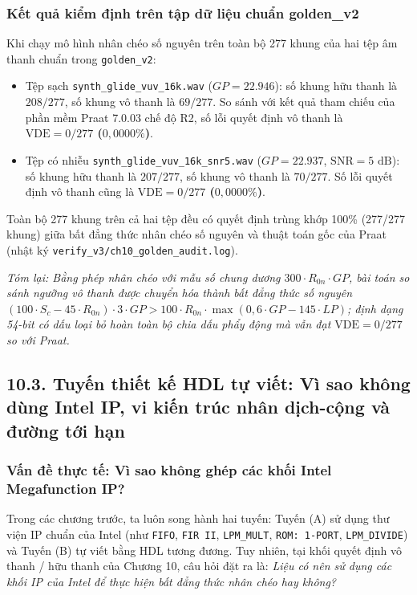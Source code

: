 \subsubsection*{Kết quả kiểm định trên tập dữ liệu chuẩn golden\_v2}
Khi chạy mô hình nhân chéo số nguyên trên toàn bộ 277 khung của hai tệp âm thanh chuẩn trong \texttt{golden\_v2}:
\begin{itemize}
    \item Tệp sạch \texttt{synth\_glide\_vuv\_16k.wav} ($GP = 22.946$): số khung hữu thanh là $208 / 277$, số khung vô thanh là $69 / 277$. So sánh với kết quả tham chiếu của phần mềm Praat 7.0.03 chế độ R2, số lỗi quyết định vô thanh là \textbf{$\text{VDE} = 0 / 277$ ($0{,}0000\%$)}.
    \item Tệp có nhiễu \texttt{synth\_glide\_vuv\_16k\_snr5.wav} ($GP = 22.937$, $\text{SNR} = 5\text{ dB}$): số khung hữu thanh là $207 / 277$, số khung vô thanh là $70 / 277$. Số lỗi quyết định vô thanh cũng là \textbf{$\text{VDE} = 0 / 277$ ($0{,}0000\%$)}.
\end{itemize}
Toàn bộ 277 khung trên cả hai tệp đều có quyết định trùng khớp 100\% (277/277 khung) giữa bất đẳng thức nhân chéo số nguyên và thuật toán gốc của Praat (nhật ký \texttt{verify\_v3/ch10\_golden\_audit.log}).

\textit{Tóm lại: Bằng phép nhân chéo với mẫu số chung dương $300 \cdot R_{0n} \cdot GP$, bài toán so sánh ngưỡng vô thanh được chuyển hóa thành bất đẳng thức số nguyên $(100\cdot S_c - 45\cdot R_{0n})\cdot 3\cdot GP > 100\cdot R_{0n}\cdot \max(0, 6\cdot GP - 145\cdot LP)$; định dạng 54-bit có dấu loại bỏ hoàn toàn bộ chia dấu phẩy động mà vẫn đạt $\text{VDE} = 0/277$ so với Praat.}

\subsection*{10.3. Tuyến thiết kế HDL tự viết: Vì sao không dùng Intel IP, vi kiến trúc nhân dịch-cộng và đường tới hạn}

\subsubsection*{Vấn đề thực tế: Vì sao không ghép các khối Intel Megafunction IP?}
Trong các chương trước, ta luôn song hành hai tuyến: Tuyến (A) sử dụng thư viện IP chuẩn của Intel (như \texttt{FIFO}, \texttt{FIR II}, \texttt{LPM\_MULT}, \texttt{ROM: 1-PORT}, \texttt{LPM\_DIVIDE}) và Tuyến (B) tự viết bằng HDL tương đương. Tuy nhiên, tại khối quyết định vô thanh / hữu thanh của Chương 10, câu hỏi đặt ra là: \emph{Liệu có nên sử dụng các khối IP của Intel để thực hiện bất đẳng thức nhân chéo hay không?}

